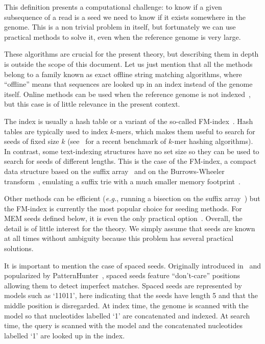 \documentclass{article}
\begin{document}
This definition presents a computational challenge: to know if a given
subsequence of a read is a seed we need to know if it exists somewhere in
the genome. This is a non trivial problem in itself, but fortunately we
can use practical methods to solve it, even when the reference genome is
very large.

These algorithms are crucial for the present theory, but describing them
in depth is outside the scope of this document. Let us just mention that
all the methods belong to a family known as exact offline string matching
algorithms, where ``offline'' means that sequences are looked up in an
index instead of the genome itself. Online methods can be used when the
reference genome is not indexed~\cite{faro2013exact}, but this case is of
little relevance in the present context.

The index is usually a hash table or a variant of the so-called
FM-index~\cite{ferragina2000opportunistic, ferragina2005indexing}. Hash
tables are typically used to index $k$-mers, which makes them useful to
search for seeds of fixed size $k$ (see~\cite{pmid30346548} for a recent
benchmark of $k$-mer hashing algorithms). In contrast, some text-indexing
structures have no set size so they can be used to search for seeds of
different lengths. This is the case of the FM-index, a compact data
structure based on the suffix array~\cite{manber1993suffix} and on the
Burrows-Wheeler transform~\cite{burrows1994block}, emulating a suffix trie
with a much smaller memory footprint~\cite{ferragina2000opportunistic,
ferragina2005indexing}.

Other methods can be efficient (\textit{e.g.}, running a bisection on the
suffix array~\cite{dobin2013star}) but the FM-index is currently the most
popular choice for seeding methods. For MEM seeds defined below, it is
even the only practical option~\cite{pmid24336412, pmid25399029,
pmid23349213, pmid19389736}. Overall, the detail is of little interest for
the theory. We simply assume that seeds are known at all times without
ambiguity because this problem has several practical solutions.

It is important to mention the case of spaced seeds. Originally introduced
in~\cite{califano1993flash} and popularized by
PatternHunter~\cite{pmid11934743}, spaced seeds feature ``don't-care''
positions allowing them to detect imperfect matches. Spaced seeds are
represented by models such as `11011', here indicating that the seeds have
length 5 and that the middle position is disregarded. At index time, the
genome is scanned with the model so that nucleotides labelled `1' are
concatenated and indexed. At search time, the query is scanned with the
model and the concatenated nucleotides labelled `1' are looked up in the
index.
\end{document}
